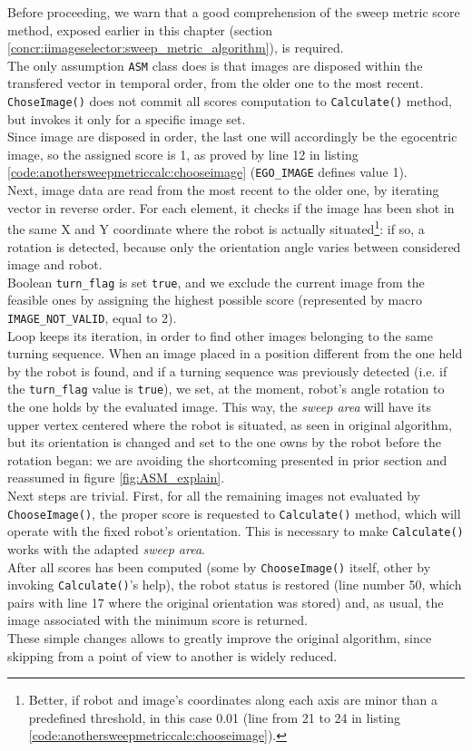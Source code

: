 Before proceeding, we warn that a good comprehension
of the sweep metric score method, exposed earlier in this chapter
(section \ref{concr:iimageselector:sweep_metric_algorithm}),
is required.
\\
The only assumption \texttt{ASM} class does is that images are disposed within
the transfered vector in temporal order, from the older one
to the most recent. \texttt{ChoseImage()} does not commit all scores
computation to \texttt{Calculate()} method, but invokes it only
for a specific image set.
\\
Since image are disposed in order, the last one will accordingly be
the egocentric image, so the assigned score is 1, as proved by
line 12 in listing \ref{code:anothersweepmetriccalc:chooseimage}
(\texttt{EGO\_IMAGE} defines value 1).
\\
Next, image data are read from the most recent to the older one,
by iterating vector in reverse order. For each element, it checks
if the image has been shot in the same X and Y coordinate
where the robot is actually
situated\footnote{Better, if robot and image's coordinates along each axis
are minor than a predefined threshold, in this case 0.01
(line from 21 to 24 in listing \ref{code:anothersweepmetriccalc:chooseimage}).}:
if so, a rotation is detected, because only the orientation angle
varies between considered image and robot.
\\
Boolean \texttt{turn\_flag} is set \texttt{true}, and we exclude the
current image from the feasible ones by assigning the highest possible
score (represented by macro \texttt{IMAGE\_NOT\_VALID}, equal to 2).
\\
Loop keeps its iteration,  in order to find other images belonging
to the same turning sequence. When an image placed in a position
different from the one held by the robot is found, and if a turning sequence
was previously detected (i.e. if the \texttt{turn\_flag} value is
\texttt{true}), we set, at the moment, robot's angle rotation to
the one holds by the evaluated image. This way, the \textit{sweep
area} will have its upper vertex centered where the robot is situated,
as seen in original algorithm, but its orientation is changed and
set to the one owns by the
robot before the rotation began: we are avoiding the shortcoming
presented in prior section and reassumed in figure \ref{fig:ASM_explain}.
\\
Next steps are trivial. First, for all the remaining images not
evaluated by \texttt{ChooseImage()}, the proper score is requested
to \texttt{Calculate()} method, which will operate with the fixed
robot's orientation. This is necessary to make \texttt{Calculate()}
works with the adapted \textit{sweep area}.
\\
After all scores has been computed (some by \texttt{ChooseImage()}
itself, other by invoking \texttt{Calculate()}'s help), the robot
status is restored (line number 50, which pairs with line 17 where
the original orientation was stored) and, as usual, the image associated
with the minimum score is returned.
\\
These simple changes allows to greatly improve the original algorithm,
since skipping from a point of view to another is widely reduced.
